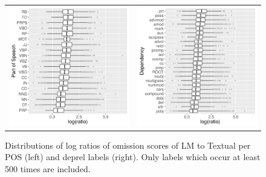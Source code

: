\begin{figure}[t]
  \centering
  \hspace*{-0.2in}
  \setlength{\tabcolsep}{0pt}
  \begin{tabular}{cc}
  \includegraphics[scale=0.55]{imaginet-omission-quotient-pos-boxplot.png} &
  \includegraphics[scale=0.55]{imaginet-omission-quotient-dep-boxplot.png} \\  
  \end{tabular}
  \caption{Distributions of log ratios of omission scores of {\sc LM} to {\sc Textual} per
    POS (left) and deprel labels (right). Only labels which occur at least 500 times are included.}
\label{fig:omission-imaginet-ratio}
\end{figure}


